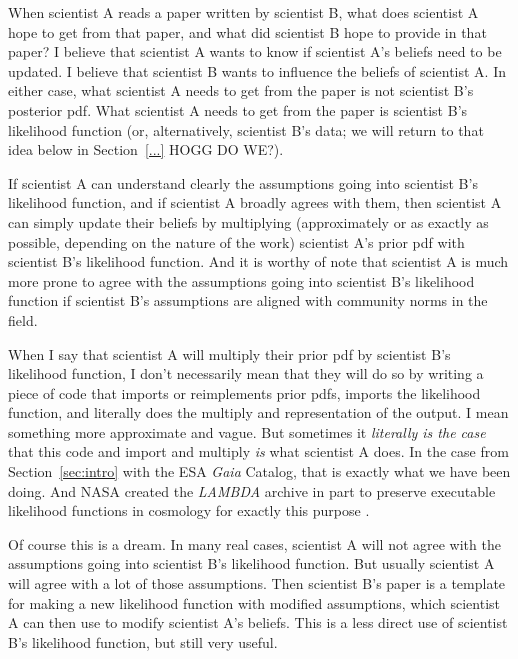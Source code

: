 \documentclass{article}
\newcommand{\sectionname}{Section}
\newcommand{\secref}[1]{\sectionname~\ref{#1}}
\begin{document}
When scientist A reads a paper written by scientist B, what does scientist A hope to get from that paper, and what did scientist B hope to provide in that paper?
I believe that scientist A wants to know if scientist A's beliefs need to be updated.
I believe that scientist B wants to influence the beliefs of scientist A.
In either case, what scientist A needs to get from the paper is not scientist B's posterior pdf.
What scientist A needs to get from the paper is scientist B's likelihood function (or, alternatively, scientist B's data; we will return to that idea below in \secref{...} HOGG DO WE?).

If scientist A can understand clearly the assumptions going into scientist B's likelihood function,
and if scientist A broadly agrees with them,
then scientist A can simply update their beliefs by multiplying (approximately or as exactly as possible, depending on the nature of the work)
scientist A's prior pdf with scientist B's likelihood function.
And it is worthy of note that scientist A is much more prone to agree with the assumptions going into scientist B's likelihood function if scientist B's assumptions are aligned with community norms in the field.

When I say that scientist A will multiply their prior pdf by scientist B's likelihood function,
I don't necessarily mean that they will do so by writing a piece of code that imports or reimplements prior pdfs, imports the likelihood function, and literally does the multiply and representation of the output.
I mean something more approximate and vague.
But sometimes it \emph{literally is the case} that this code and import and multiply \emph{is} what scientist A does.
In the case from \secref{sec:intro} with the ESA \textsl{Gaia} Catalog, that is exactly what we have been doing.
And NASA created the \textsl{LAMBDA} archive in part to preserve executable likelihood functions in cosmology for exactly this purpose \cite{lambda}.

Of course this is a dream.
In many real cases, scientist A will not agree with the assumptions going into scientist B's likelihood function.
But usually scientist A will agree with a lot of those assumptions.
Then scientist B's paper is a template for making a new likelihood function with modified assumptions, which scientist A can then use to modify scientist A's beliefs.
This is a less direct use of scientist B's likelihood function, but still very useful.
\end{document}
